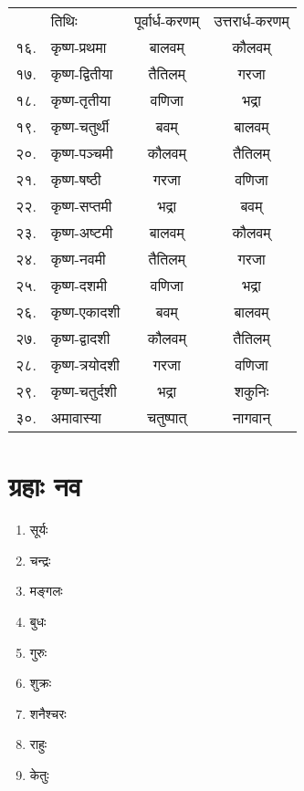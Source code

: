 \begin{tabular}{llcc}
  & तिथिः & पूर्वार्ध-करणम् & उत्तरार्ध-करणम्\\
१६. & कृष्ण-प्रथमा & बालवम् & कौलवम्\\
१७. & कृष्ण-द्वितीया & तैतिलम् & गरजा\\
१८. & कृष्ण-तृतीया & वणिजा & भद्रा\\
१९. & कृष्ण-चतुर्थी & बवम् & बालवम्\\
२०. & कृष्ण-पञ्चमी & कौलवम् & तैतिलम्\\
२१. & कृष्ण-षष्ठी & गरजा & वणिजा\\
२२. & कृष्ण-सप्तमी & भद्रा & बवम्\\
२३. & कृष्ण-अष्टमी & बालवम् & कौलवम्\\
२४. & कृष्ण-नवमी & तैतिलम् & गरजा\\
२५. & कृष्ण-दशमी & वणिजा & भद्रा\\
२६. & कृष्ण-एकादशी & बवम् & बालवम्\\
२७. & कृष्ण-द्वादशी & कौलवम् & तैतिलम्\\
२८. & कृष्ण-त्रयोदशी & गरजा & वणिजा\\
२९. & कृष्ण-चतुर्दशी & भद्रा & शकुनिः\\
३०. & अमावास्या & चतुष्पात् & नागवान्\\
\end{tabular}


\begin{minipage}{\linewidth}
\section*{ग्रहाः नव}
\begin{multicols}{3}
\begin{enumerate}\itemsep-1ex 

\item सूर्यः
\item चन्द्रः
\item मङ्गलः 
\item बुधः
\item गुरुः 
\item शुक्रः
\item शनैश्चरः 
\item राहुः 
\item केतुः 

\end{enumerate}
\end{multicols}

\end{minipage}























